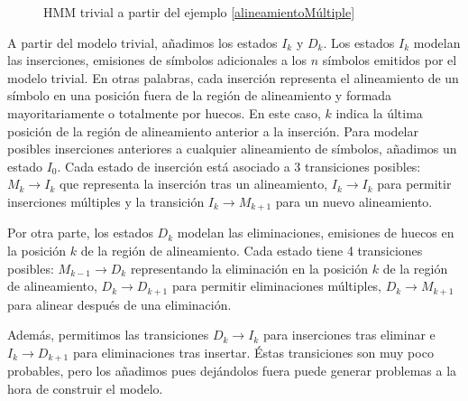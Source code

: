 \begin{figure}[H]
\centering
{}
\caption{HMM trivial a partir del ejemplo \ref{alineamientoMúltiple}}
\end{figure}
A partir del modelo trivial, añadimos los estados $I_k$ y $D_k$. Los estados $I_k$ modelan las inserciones, emisiones de símbolos adicionales a los $n$ símbolos emitidos por el modelo trivial. En otras palabras, cada inserción representa el alineamiento de un símbolo en una posición fuera de la región de alineamiento y formada mayoritariamente o totalmente por huecos. En este caso, $k$ indica la última posición de la región de alineamiento anterior a la inserción. Para modelar posibles inserciones anteriores a cualquier alineamiento de símbolos, añadimos un estado $I_0$. Cada estado de inserción está asociado a $3$ transiciones posibles: $M_k\rightarrow I_k$ que representa la inserción tras un alineamiento, $I_k\rightarrow I_k$ para permitir inserciones múltiples y la transición $I_k\rightarrow M_{k+1}$ para un nuevo alineamiento. 

Por otra parte, los estados $D_k$ modelan las eliminaciones, emisiones de huecos en la posición $k$ de la región de alineamiento. Cada estado tiene 4 transiciones posibles: $M_{k-1}\rightarrow D_k$ representando la eliminación en la posición $k$ de la región de alineamiento, $D_k \rightarrow D_{k+1}$ para permitir eliminaciones múltiples, $D_k\rightarrow M_{k+1}$ para alinear después de una eliminación. 

Además, permitimos las transiciones $D_k \rightarrow I_k$ para inserciones tras eliminar e $I_{k}\rightarrow D_{k+1}$ para eliminaciones tras insertar. Éstas transiciones son muy poco probables, pero los añadimos pues dejándolos fuera puede generar problemas a la hora de construir el modelo.

